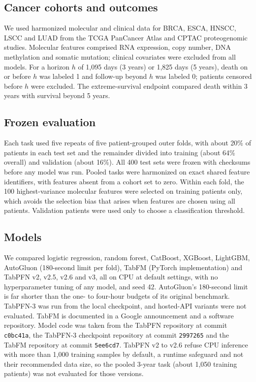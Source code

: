 \documentclass[11pt, a4paper, onecolumn, confidential, copyright]{hawkfranklin}
\begin{document}
\subsection*{Cancer cohorts and outcomes}
We used harmonized molecular and clinical data for BRCA, ESCA, HNSCC, LSCC and LUAD from the TCGA PanCancer Atlas and CPTAC proteogenomic studies.\citep{tcga2012brca,tcga2017esca,tcga2015hnsc,tcga2012lusc,tcga2014luad,liu2018clinical,li2023pancancer} Molecular features comprised RNA expression, copy number, DNA methylation and somatic mutation; clinical covariates were excluded from all models. For a horizon $h$ of 1,095 days (3 years) or 1,825 days (5 years), death on or before $h$ was labeled 1 and follow-up beyond $h$ was labeled 0; patients censored before $h$ were excluded. The extreme-survival endpoint compared death within 3 years with survival beyond 5 years.

\subsection*{Frozen evaluation}
Each task used five repeats of five patient-grouped outer folds, with about 20\% of patients in each test set and the remainder divided into training (about 64\% overall) and validation (about 16\%). All 400 test sets were frozen with checksums before any model was run. Pooled tasks were harmonized on exact shared feature identifiers, with features absent from a cohort set to zero. Within each fold, the 100 highest-variance molecular features were selected on training patients only, which avoids the selection bias that arises when features are chosen using all patients.\citep{ambroise2002selection} Validation patients were used only to choose a classification threshold.

\subsection*{Models}
We compared logistic regression, random forest, CatBoost, XGBoost, LightGBM, AutoGluon (180-second limit per fold), TabFM (PyTorch implementation) and TabPFN v2, v2.5, v2.6 and v3, all on CPU at default settings, with no hyperparameter tuning of any model, and seed 42.\citep{breiman2001random,chen2016xgboost,ke2017lightgbm,prokhorenkova2018catboost,erickson2020autogluon,hollmann2025accurate,google2026tabfm,tabfmsoftware2026} AutoGluon's 180-second limit is far shorter than the one- to four-hour budgets of its original benchmark.\citep{erickson2020autogluon} TabPFN-3 was run from the local checkpoint, and hosted-API variants were not evaluated.\citep{priorlabs2026tabpfn3} TabFM is documented in a Google announcement and a software repository. Model code was taken from the TabPFN repository at commit \texttt{c0bc41a}, the TabPFN-3 checkpoint repository at commit \texttt{2997265} and the TabFM repository at commit \texttt{5ee6cd7}. TabPFN v2 to v2.6 refuse CPU inference with more than 1,000 training samples by default, a runtime safeguard and not their recommended data size, so the pooled 3-year task (about 1,050 training patients) was not evaluated for those versions.
\end{document}
